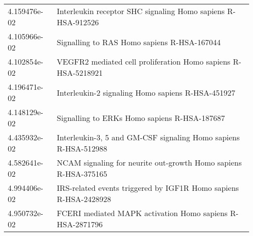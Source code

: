 \begin{longtable}{p{2.4cm}p{14.5cm}}
             4.159476e-02 &                         Interleukin receptor SHC signaling Homo sapiens R-HSA-912526 \\
             4.105966e-02 &                                          Signalling to RAS Homo sapiens R-HSA-167044 \\
             4.102854e-02 &                        VEGFR2 mediated cell proliferation Homo sapiens R-HSA-5218921 \\
             4.196471e-02 &                                    Interleukin-2 signaling Homo sapiens R-HSA-451927 \\
             4.148129e-02 &                                         Signalling to ERKs Homo sapiens R-HSA-187687 \\
             4.435932e-02 &                      Interleukin-3, 5 and GM-CSF signaling Homo sapiens R-HSA-512988 \\
             4.582641e-02 &                      NCAM signaling for neurite out-growth Homo sapiens R-HSA-375165 \\
             4.994406e-02 &                     IRS-related events triggered by IGF1R Homo sapiens R-HSA-2428928 \\
             4.950732e-02 &                            FCERI mediated MAPK activation Homo sapiens R-HSA-2871796 \\
\end{longtable}


